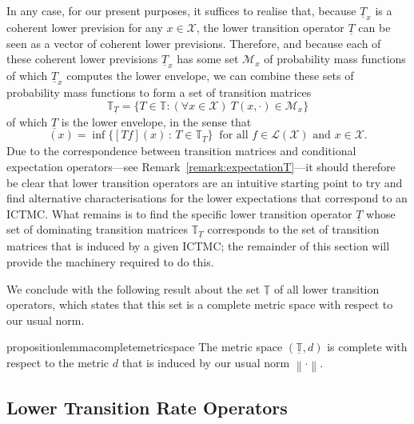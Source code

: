 \documentclass[10pt,a4paper]{paper}
\theoremstyle{definition}
\newcommand{\states}{\mathcal{X}}
\newcommand{\lt}{\underline{T}}
\newcommand{\gambles}{\mathcal{L}}
\newcommand{\gamblesX}{\gambles(\states)}
\newcommand{\norm}[1]{\left\lVert #1 \right\rVert}
\newcommand{\ictmc}{{ICTMC}}
\begin{document}
In any case, for our present purposes, it suffices to realise that, because $\lt_x$ is a coherent lower prevision for any $x\in\states$, the lower transition operator $\lt$ can be seen as a vector of coherent lower previsions. Therefore, and because each of these coherent lower previsions $\lt_x$ has some set $\mathcal{M}_x$ of probability mass functions of which $\lt_x$ computes the lower envelope, we can combine these sets of probability mass functions to form a set of transition matrices
\begin{equation*}
\mathbb{T}_{\lt}=\{T\in\mathbb{T}\colon (\forall x\in\states)~T(x,\cdot)\in\mathcal{M}_x\}
\end{equation*}
of which $\lt$ is the lower envelope, in the sense that
\begin{equation*}
[\lt f](x) = \inf\{ [Tf](x)\,:\, T\in\mathbb{T}_{\lt} \}~
\text{ for all $f\in\gamblesX$ and $x\in\states$.}
\end{equation*}
Due to the correspondence between transition matrices and conditional expectation operators---see Remark~\ref{remark:expectationT}---it should therefore be clear that lower transition operators are an intuitive starting point to try and find alternative characterisations for the lower expectations that correspond to an \ictmc. What remains is to find the specific lower transition operator $\lt$ whose set of dominating transition matrices $\mathbb{T}_{\lt}$ corresponds to the set of transition matrices that is induced by a given \ictmc; the remainder of this section will provide the machinery required to do this.


We conclude with the following result about the set $\underline{\mathbb{T}}$ of all lower transition operators, which states that this set is a complete metric space with respect to our usual norm.

\begin{restatable}{proposition}{lemmacompletemetricspace}
\label{lemma:completemetricspace}
The metric space $(\underline{\mathbb{T}},d)$ is complete with respect to the metric $d$ that is induced by our usual norm $\norm{\cdot}$.
\end{restatable}

\subsection{Lower Transition Rate Operators}\label{sec:connections_rate}
\end{document}
